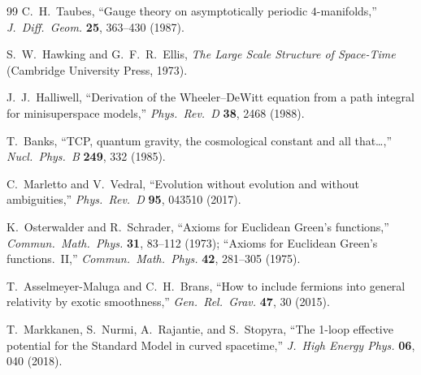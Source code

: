 \documentclass[12pt,a4paper]{article}
\theoremstyle{definition}
\theoremstyle{remark}
\begin{document}
\begin{thebibliography}{99}
C.~H.~Taubes,
``Gauge theory on asymptotically periodic $4$-manifolds,''
\textit{J.\ Diff.\ Geom.} \textbf{25}, 363--430 (1987).

S.~W.~Hawking and G.~F.~R.~Ellis,
\textit{The Large Scale Structure of Space-Time}
(Cambridge University Press, 1973).

J.~J.~Halliwell,
``Derivation of the Wheeler--DeWitt equation from a path integral for
minisuperspace models,''
\textit{Phys.\ Rev.\ D} \textbf{38}, 2468 (1988).

T.~Banks,
``TCP, quantum gravity, the cosmological constant and all that\ldots,''
\textit{Nucl.\ Phys.\ B} \textbf{249}, 332 (1985).

C.~Marletto and V.~Vedral,
``Evolution without evolution and without ambiguities,''
\textit{Phys.\ Rev.\ D} \textbf{95}, 043510 (2017).

K.~Osterwalder and R.~Schrader,
``Axioms for Euclidean Green's functions,''
\textit{Commun.\ Math.\ Phys.} \textbf{31}, 83--112 (1973);
``Axioms for Euclidean Green's functions.\ II,''
\textit{Commun.\ Math.\ Phys.} \textbf{42}, 281--305 (1975).

T.~Asselmeyer-Maluga and C.~H.~Brans,
``How to include fermions into general relativity by exotic smoothness,''
\textit{Gen.\ Rel.\ Grav.} \textbf{47}, 30 (2015).

T.~Markkanen, S.~Nurmi, A.~Rajantie, and S.~Stopyra,
``The 1-loop effective potential for the Standard Model in curved
spacetime,''
\textit{J.\ High Energy Phys.} \textbf{06}, 040 (2018).

\end{thebibliography}
\end{document}
